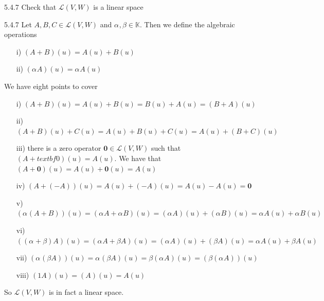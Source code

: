 \documentclass[a4paper,norsk]{article}
\begin{document}
\begin{oppgavebox}{5.4.7}{}
Check that $ \mathcal{L} \left( V, W \right)  $ is a linear space
\begin{proofbox}{5.4.7}{}
    Let $ A, B, C \in  \mathcal{L} \left( V, W \right)  $ and $ \alpha_{}^{} , \beta \in \mathbb{K}  $. Then we define the algebraic operations
    \begin{itemize}
        \item[i)] $ \left( A + B \right) (u) = A(u) + B(u) $  
        \item[ii)] $ \left( \alpha_{}^{} A \right)(u) = \alpha_{}^{} A(u)  $  
    \end{itemize}

    We have eight points to cover
    \begin{itemize}
        \item[i)] $ \left( A + B \right) (u) = A(u) + B(u) = B(u) + A(u) = \left( B+A \right) (u) $ 
        \item[ii)] $ \left( A + B \right) (u) + C(u) = A(u) + B(u) + C(u) = A(u) + \left( B + C \right)(u)  $  
        \item[iii)] there is a zero operator $ \textbf{0} \in \mathcal{L}(V, W) $ such that $ \left( A + textbf{0} \right)(u) = A(u)  $. We have that $ \left( A + \textbf{0} \right) (u) =A(u) + \textbf{0}(u) = A(u) $ 
        \item[iv)] $ \left( A + \left( -A \right)  \right)(u)  = A(u) + \left( -A \right)(u) = A(u) - A(u) = \textbf{0}  $ 
        \item[v)] $ \left( \alpha_{}^{} \left( A + B \right)  \right)(u) =  \left( \alpha_{}^{} A + \alpha_{}^{} B \right)(u) = \left( \alpha_{}^{} A \right)(u) + \left( \alpha_{}^{} B \right)(u) = \alpha_{}^{} A(u) + \alpha_{}^{} B(u)     $  
        \item[vi)] $ \left( \left( \alpha_{}^{} + \beta \right)A  \right)(u) = \left( \alpha_{}^{} A + \beta A \right)(u) = \left( \alpha_{}^{} A \right)(u) + \left( \beta A \right)(u) = \alpha_{}^{} A(u) + \beta A(u)     $  
        \item[vii)] $ \left( \alpha_{}^{}  \left( \beta A \right)  \right)(u) = \alpha_{}^{} \left( \beta A \right)(u) = \beta \left( \alpha_{}^{} A \right) (u) = \left( \beta \left( \alpha_{}^{} A \right)  \right)(u)     $  
        \item[viii)] $ \left( 1 A \right)(u) = \left( A \right) (u) = A(u)   $  
    \end{itemize}
    So $ \mathcal{L} \left( V, W \right)  $ is in fact a linear space.
\end{proofbox}
\end{oppgavebox}
\end{document}
